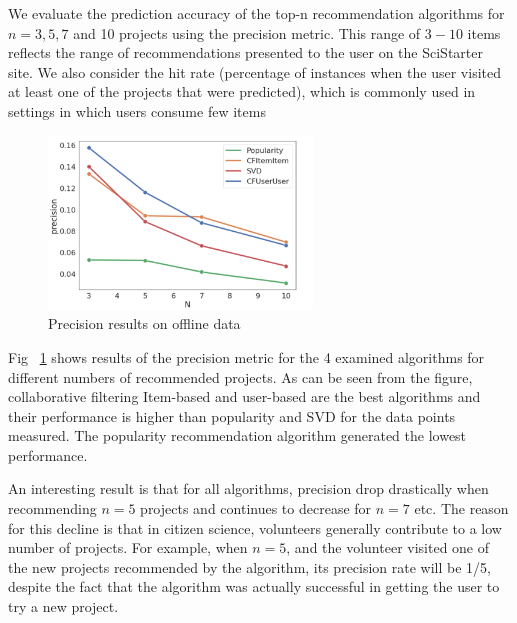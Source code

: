 \documentclass[letterpaper]{article} %
\begin{document}

We evaluate the prediction accuracy of the top-n recommendation algorithms for $n=3, 5, 7$ and 10 projects using the precision metric. This range of $3 - 10$ items reflects the range of recommendations presented to the user on the SciStarter site.
We also consider the hit rate (percentage of instances when the user visited at least one of the projects that were predicted), which is commonly used in settings in which users consume few items~\cite{wang2015recommendation}

 

\begin{figure}[t]
\centering
\includegraphics[width=7cm]{Figs/Presicion_N.png}
\caption{Precision results on offline data}
\label{fig:offline}
\end{figure}
 
 Fig ~\ref{fig:offline} shows results of the precision metric for
the 4 examined algorithms for different numbers of recommended projects. As can be seen from the figure,
collaborative filtering  Item-based and user-based are the best 
algorithms and their performance is higher than popularity
and SVD for the data points measured. The popularity recommendation algorithm generated the lowest performance.

An interesting result is that for all algorithms, precision
drop drastically when recommending $n=5$
projects and continues to decrease for $n=7$ etc. The reason
for this decline is that in citizen science, volunteers generally
contribute to a low number of projects. For example, when
$n=5$, and the volunteer visited one of the new projects recommended by the algorithm,
its precision rate will be 1/5,
despite the fact that the algorithm was actually successful in
getting the user to try a new project.
\end{document}
